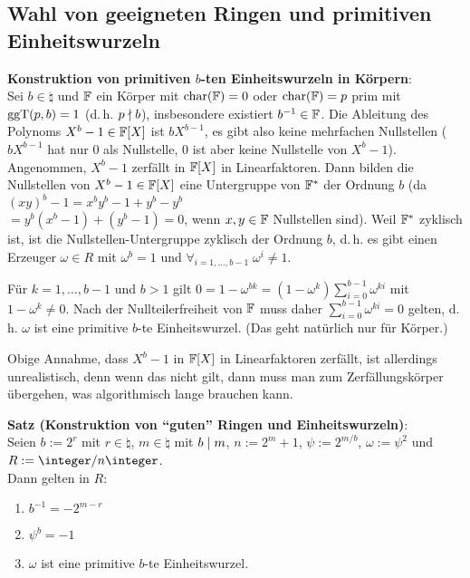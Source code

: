 \subsection{%
    Wahl von geeigneten Ringen und primitiven Einheitswurzeln%
}

\textbf{Konstruktion von primitiven $b$-ten Einheitswurzeln in Körpern}:\\
Sei $b \in \natural$ und $\mathbb{F}$ ein Körper mit $\operatorname{char}(\mathbb{F}) = 0$ oder $\operatorname{char}(\mathbb{F}) = p$ prim
mit $\operatorname{ggT}(p, b) = 1$ (d.\,h. $p \nmid b$),
insbesondere existiert $b^{-1} \in \mathbb{F}$.
Die Ableitung des Polynoms $X^b - 1 \in \mathbb{F}[X]$ ist $bX^{b-1}$,
es gibt also keine mehrfachen Nullstellen
($bX^{b-1}$ hat nur $0$ als Nullstelle, $0$ ist aber keine Nullstelle von $X^b - 1$).
Angenommen, $X^b - 1$ zerfällt in $\mathbb{F}[X]$ in Linearfaktoren.
Dann bilden die Nullstellen von $X^b - 1 \in \mathbb{F}[X]$ eine Untergruppe von $\mathbb{F}^\ast$
der Ordnung $b$
(da $(xy)^b - 1 = x^b y^b - 1 + y^b - y^b$\\
$= y^b (x^b - 1) + (y^b - 1) = 0$,
wenn $x, y \in \mathbb{F}$ Nullstellen sind).
Weil $\mathbb{F}^\ast$ zyklisch ist, ist die Nullstellen-Untergruppe zyklisch der Ordnung $b$,
d.\,h. es gibt einen Erzeuger $\omega \in R$ mit $\omega^b = 1$ und
$\forall_{i=1,\dotsc,b-1}\; \omega^i \not= 1$.

Für $k = 1, \dotsc, b - 1$ und $b > 1$ gilt
$0 = 1 - \omega^{bk} = (1 - \omega^k) \sum_{i=0}^{b-1} \omega^{ki}$ mit
$1 - \omega^k \not= 0$.
Nach der Nullteilerfreiheit von $\mathbb{F}$ muss daher $\sum_{i=0}^{b-1} \omega^{ki} = 0$ gelten,
d.\,h. $\omega$ ist eine primitive $b$-te Einheitswurzel.
(Das geht natürlich nur für Körper.)

Obige Annahme, dass $X^b - 1$ in $\mathbb{F}[X]$ in Linearfaktoren zerfällt, ist allerdings
unrealistisch, denn wenn das nicht gilt, dann muss man zum Zerfällungskörper übergehen,
was algorithmisch lange brauchen kann.

\linie

\textbf{Satz (Konstruktion von "`guten"' Ringen und Einheitswurzeln)}:\\
Seien $b := 2^r$ mit $r \in \natural$,
$m \in \natural$ mit $b \mid m$,
$n := 2^m + 1$,
$\psi := 2^{m/b}$,
$\omega := \psi^2$ und
$R := \ZnZ$.\\
Dann gelten in $R$:
\begin{enumerate}
    \item
    $b^{-1} = -2^{m-r}$
    
    \item
    $\psi^b = -1$
    
    \item
    $\omega$ ist eine primitive $b$-te Einheitswurzel.
\end{enumerate}

